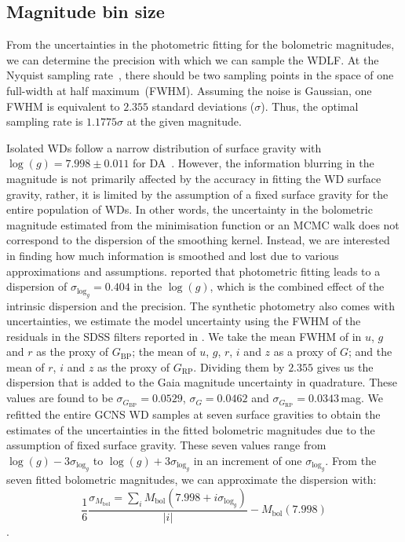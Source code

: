 \documentclass[fleqn,usenatbib]{mnras}
\begin{document}
\subsection{Magnitude bin size}
\label{sec:magnitude_bin_size}
From the uncertainties in the photometric fitting for the bolometric magnitudes,
we can determine the precision with which we can sample the WDLF. At the Nyquist
sampling rate~\citep{1949IEEEP..37...10S}, there should be two sampling points
in the space of one full-width at half maximum~(FWHM). Assuming the noise is
Gaussian, one FWHM is equivalent to $2.355$ standard deviations ($\sigma$).
Thus, the optimal sampling rate is $1.1775\sigma$ at the given magnitude.

Isolated WDs follow a narrow distribution of surface gravity with
$\log(g)=7.998 \pm 0.011$ for DA~\citep{2021MNRAS.507.4646K}. However, the
information blurring in the magnitude is not primarily affected by the accuracy
in fitting the WD surface gravity, rather, it is limited by the assumption of a
fixed surface gravity for the entire population of WDs. In other words, the
uncertainty in the bolometric magnitude estimated from the minimisation
function or an MCMC walk does not correspond to the dispersion of the
smoothing kernel. Instead, we are interested in finding how much information
is smoothed and lost due to various approximations and assumptions.
\citet{2014ApJ...796..128G} reported that photometric fitting leads to a
dispersion of $\sigma_{\mathrm{log}_{g}} = 0.404$ in the $\log(g)$, which is
the combined effect of the intrinsic dispersion and the precision. The
synthetic photometry also comes with uncertainties, we estimate the model
uncertainty using the FWHM of the residuals in the SDSS filters reported in
\citet{2006AJ....132.1221H}. We take the mean FWHM of in $u$, $g$ and $r$ as
the proxy of $G_{\mathrm{BP}}$; the mean of $u$, $g$, $r$, $i$ and $z$ as a proxy of
$G$; and the mean of $r$, $i$ and $z$ as the proxy of $G_{\mathrm{RP}}$. Dividing them
by $2.355$ gives us the dispersion that is added to the Gaia magnitude
uncertainty in quadrature. These values are found to be
$\sigma_{G_{\mathrm{BP}}}=0.0529$, $\sigma_{G}=0.0462$ and $\sigma_{G_{\mathrm{RP}}}=0.0343$\,mag.
We refitted the entire GCNS WD samples at seven surface gravities to obtain
the estimates of the uncertainties in the fitted bolometric magnitudes due to
the assumption of fixed surface gravity. These seven values range from
$\log(g) - 3\sigma_{\mathrm{log}_{g}}$ to $\log(g) + 3\sigma_{\mathrm{log}_{g}}$
in an increment of one $\sigma_{\mathrm{log}_{g}}$. From the seven fitted
bolometric magnitudes, we can approximate the dispersion with:
\begin{equation}
  \frac{1}{6} \frac{\sigma_{M_{\mathrm{bol}}} = \sum_{i} M_{\mathrm{bol}}(7.998 + i\sigma_{\mathrm{log}_{g}})}{|i|} - M_{\mathrm{bol}}(7.998)
\end{equation}
.
\end{document}
